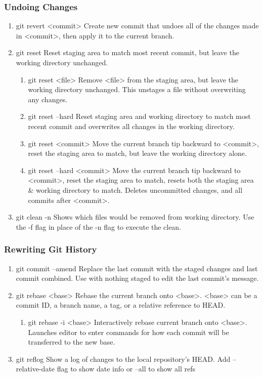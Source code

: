 \documentclass[11pt]{article}
\begin{document}
\subsubsection{Undoing Changes}
\label{sec:org8d4fb4f}
\begin{enumerate}
\item git revert <commit>
\label{sec:orgb544109}
Create new commit that undoes all of the changes made in
<commit>, then apply it to the current branch.
\item git reset
\label{sec:orgb6b8e32}
Reset staging area to match most recent commit, but leave the
working directory unchanged.
\begin{enumerate}
\item git reset <file>
\label{sec:org152aa21}
Remove <file> from the staging area, but leave the working directory
unchanged. This unstages a file without overwriting any changes.
\item git reset --hard
\label{sec:org2bd4050}
Reset staging area and working directory to match most recent
commit and overwrites all changes in the working directory.
\item git reset <commit>
\label{sec:orge59e7fa}
Move the current branch tip backward to <commit>, reset the
staging area to match, but leave the working directory alone.
\item git reset --hard <commit>
\label{sec:org49a4522}
Move the current branch tip backward to <commit>, reset the
staging area to match, resets both the staging area \& working directory to
match. Deletes uncommitted changes, and all commits after <commit>.
\end{enumerate}
\item git clean -n
\label{sec:org850abbd}
Shows which files would be removed from working directory. Use
the -f flag in place of the -n flag to execute the clean.
\end{enumerate}
\subsubsection{Rewriting Git History}
\label{sec:orgdff57a0}
\begin{enumerate}
\item git commit --amend
\label{sec:org89041ad}
Replace the last commit with the staged changes and last commit
combined. Use with nothing staged to edit the last commit’s message.
\item git rebase <base>
\label{sec:orgd955666}
Rebase the current branch onto <base>. <base> can be a commit ID,
a branch name, a tag, or a relative reference to HEAD.
\begin{enumerate}
\item git rebase -i <base>
\label{sec:orgee73026}
Interactively rebase current branch onto <base>. Launches editor to enter
commands for how each commit will be transferred to the new base.
\end{enumerate}
\item git reflog
\label{sec:org42ca3bf}
Show a log of changes to the local repository’s HEAD. Add
--relative-date flag to show date info or --all to show all refs
\end{enumerate}
\end{document}
